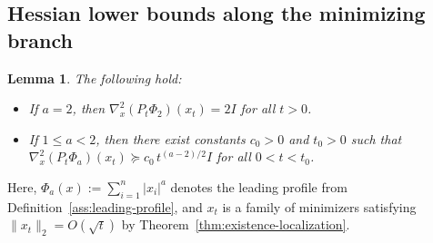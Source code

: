 \documentclass{article}
\newtheorem{lemma}[lemma]{Lemma}
\begin{document}
\subsection{Hessian lower bounds along the minimizing branch}
\begin{lemma}\label{lem:model-hessian-lower-bound}
The following hold:
\begin{itemize}
\item If $a=2$, then $\nabla_x^2(P_t\Phi_2)(x_t)=2I$ for all $t>0$.
\item If $1\le a<2$, then there exist constants $c_0>0$ and $t_0>0$ such that $\nabla_x^2(P_t\Phi_a)(x_t)\succeq c_0\,t^{(a-2)/2}I$ for all $0<t<t_0$.
\end{itemize}
\end{lemma}
Here, $\Phi_a(x):=\sum_{i=1}^n |x_i|^a$ denotes the leading profile from Definition~\ref{ass:leading-profile}, and $x_t$ is a family of minimizers satisfying $\|x_t\|_2=O(\sqrt t)$ by Theorem~\ref{thm:existence-localization}.
\end{document}
